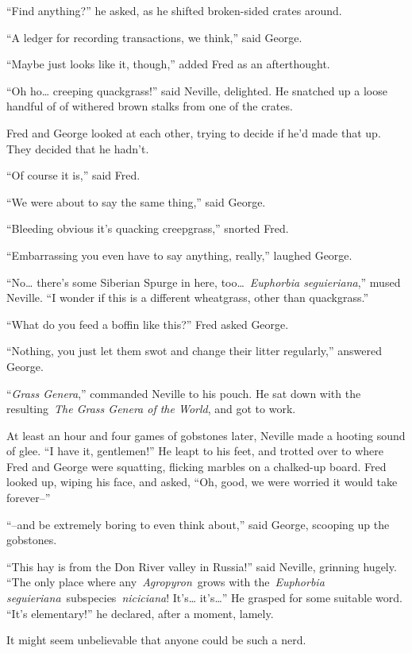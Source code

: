 ``Find anything?'' he asked, as he shifted broken-sided crates around.

``A ledger for recording transactions, we think,'' said George.

``Maybe just looks like it, though,'' added Fred as an afterthought.

``Oh ho\ldots{} creeping quackgrass!'' said Neville, delighted. He
snatched up a loose handful of of withered brown stalks from one of the
crates.

Fred and George looked at each other, trying to decide if he'd made that
up. They decided that he hadn't.

``Of course it is,'' said Fred.

``We were about to say the same thing,'' said George.

``Bleeding obvious it's quacking creepgrass,'' snorted Fred.

``Embarrassing you even have to say anything, really,'' laughed George.

``No\ldots{} there's some Siberian Spurge in here,
too\ldots~\emph{Euphorbia seguieriana},'' mused Neville. ``I wonder if
this is a different wheatgrass, other than quackgrass.''

``What do you feed a boffin like this?'' Fred asked George.

``Nothing, you just let them swot and change their litter regularly,''
answered George.

``\emph{Grass Genera},'' commanded Neville to his pouch. He sat down
with the resulting~\emph{The Grass Genera of the World}, and got to
work.

\mybreak

At least an hour and four games of gobstones later, Neville made a
hooting sound of glee. ``I have it, gentlemen!'' He leapt to his feet,
and trotted over to where Fred and George were squatting, flicking
marbles on a chalked-up board. Fred looked up, wiping his face, and
asked, ``Oh, good, we were worried it would take forever--''

``--and be extremely boring to even think about,'' said George, scooping
up the gobstones.

``This hay is from the Don River valley in Russia!'' said Neville,
grinning hugely. ``The only place where any~\emph{Agropyron}~grows with
the~\emph{Euphorbia seguieriana}~subspecies~\emph{niciciana}!
It's\ldots{} it's\ldots{}'' He grasped for some suitable word. ``It's
elementary!'' he declared, after a moment, lamely.

It might seem unbelievable that anyone could be such a nerd.

